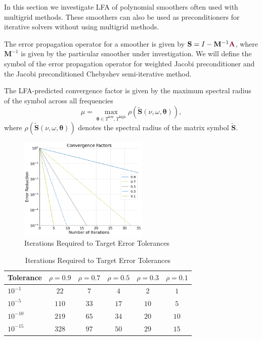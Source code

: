 In this section we investigate LFA of polynomial smoothers often used with multigrid methods.
These smoothers can also be used as preconditioners for iterative solvers without using multigrid methods.

The error propagation operator for a smoother is given by $\mathbf{S} = I - \mathbf{M}^{-1} {\color{burgundy}\mathbf{A}}$, where $\mathbf{M}^{-1}$ is given by the particular smoother under investigation.
We will define the symbol of the error propagation operator for weighted Jacobi preconditioner and the Jacobi preconditioned Chebyshev semi-iterative method.

The LFA-predicted convergence factor is given by the maximum spectral radius of the symbol across all frequencies
\begin{equation}
\mu = \max_{\boldsymbol{\theta} \in T^{\text{low}}, T^{\text{high}}} \rho \left( \tilde{\mathbf{S}} \left( \nu, \omega, \boldsymbol{\theta} \right) \right),
\end{equation}
where $ \rho \left( \tilde{\mathbf{S}} \left( \nu, \omega, \boldsymbol{\theta} \right)\right)$ denotes the spectral radius of the matrix symbol $\tilde{\mathbf{S}}$.

\begin{figure}[!ht]
  \centering
  \includegraphics[width=0.55\textwidth]{../img/convergenceFactors}
  \caption{Iterations Required to Target Error Tolerances}
  \label{fig:error_tolerance}
\end{figure}

\begin{table}[ht!]
\begin{center}
\begin{tabular}{l c c c c c}
  \toprule
  Tolerance   &  $\rho = 0.9$  &  $\rho = 0.7$  &  $\rho = 0.5$  &  $\rho = 0.3$  &  $\rho = 0.1$  \\
  \toprule
  $10^{-1}$   &  $22$          &  $7$           &  $4$           & $2$            &  $1$           \\
  $10^{-5}$   &  $110$         &  $33$          &  $17$          & $10$           &  $5$           \\
  $10^{-10}$  &  $219$         &  $65$          &  $34$          & $20$           &  $10$          \\
  $10^{-15}$  &  $328$         &  $97$          &  $50$          & $29$           &  $15$          \\
  \bottomrule
\end{tabular}
\end{center}
\caption{Iterations Required to Target Error Tolerances}
\label{table:error_tolerance}
\end{table}

